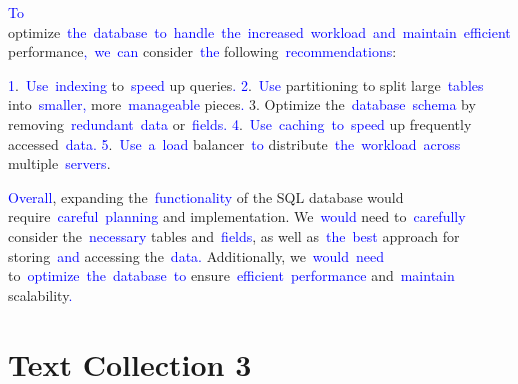 \documentclass{article}
\begin{document}
\begin{tcolorbox}[colframe=black,colback=white]
{}\textcolor{blue}{To} optimize\textcolor{blue}{~the}\textcolor{blue}{~database}\textcolor{blue}{~to}\textcolor{blue}{~handle}\textcolor{blue}{~the}\textcolor{blue}{~increased}\textcolor{blue}{~workload}\textcolor{blue}{~and}\textcolor{blue}{~maintain}\textcolor{blue}{~efficient} performance\textcolor{blue}{,}\textcolor{blue}{~we}\textcolor{blue}{~can} consider\textcolor{blue}{~the} following\textcolor{blue}{~recommendations}:

\textcolor{blue}{1}.\textcolor{blue}{~Use}\textcolor{blue}{~indexing} to\textcolor{blue}{~speed} up queries\textcolor{blue}{.
}\textcolor{blue}{2}.\textcolor{blue}{~Use} partitioning to split large\textcolor{blue}{~tables} into\textcolor{blue}{~smaller}\textcolor{blue}{,} more\textcolor{blue}{~manageable} pieces\textcolor{blue}{.
}3. Optimize the\textcolor{blue}{~database}\textcolor{blue}{~schema} by removing\textcolor{blue}{~redundant}\textcolor{blue}{~data} or\textcolor{blue}{~fields}\textcolor{blue}{.
}\textcolor{blue}{4}.\textcolor{blue}{~Use}\textcolor{blue}{~caching}\textcolor{blue}{~to}\textcolor{blue}{~speed} up frequently accessed\textcolor{blue}{~data}\textcolor{blue}{.
}\textcolor{blue}{5}.\textcolor{blue}{~Use}\textcolor{blue}{~a}\textcolor{blue}{~load} balancer\textcolor{blue}{~to} distribute\textcolor{blue}{~the}\textcolor{blue}{~workload}\textcolor{blue}{~across} multiple\textcolor{blue}{~servers}.

\textcolor{blue}{Overall}, expanding the\textcolor{blue}{~functionality} of the SQL database would require\textcolor{blue}{~careful}\textcolor{blue}{~planning} and implementation. We\textcolor{blue}{~would} need to\textcolor{blue}{~carefully} consider the\textcolor{blue}{~necessary} tables and\textcolor{blue}{~fields}, as well as\textcolor{blue}{~the}\textcolor{blue}{~best} approach for storing\textcolor{blue}{~and} accessing the\textcolor{blue}{~data}\textcolor{blue}{.} Additionally, we\textcolor{blue}{~would}\textcolor{blue}{~need} to\textcolor{blue}{~optimize}\textcolor{blue}{~the}\textcolor{blue}{~database}\textcolor{blue}{~to} ensure\textcolor{blue}{~efficient}\textcolor{blue}{~performance} and\textcolor{blue}{~maintain} scalability\textcolor{blue}{.}\textcolor{blue}{}
\end{tcolorbox}


\section*{Text Collection 3}
\end{document}
